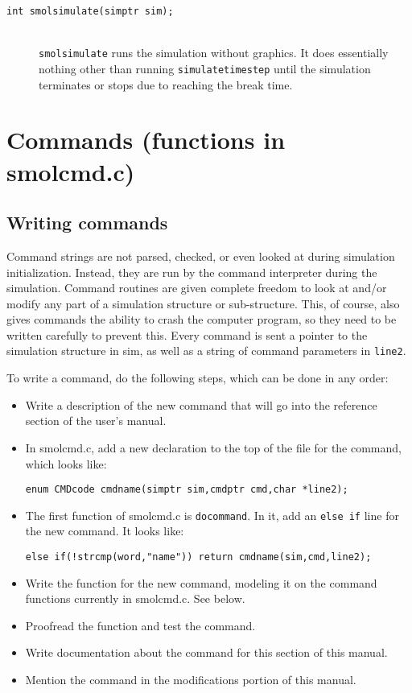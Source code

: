\documentclass {book}
\newcommand {\ttt} {\texttt}
\begin{document}
\begin{description}
\item[\ttt{int smolsimulate(simptr sim);}]
\hfill \\
\ttt{smolsimulate} runs the simulation without graphics. It does essentially nothing other than running \ttt{simulatetimestep} until the simulation terminates or stops due to reaching the break time.

\end{description}

\section{Commands (functions in smolcmd.c)}

\subsection*{Writing commands}

Command strings are not parsed, checked, or even looked at during simulation initialization. Instead, they are run by the command interpreter during the simulation. Command routines are given complete freedom to look at and/or modify any part of a simulation structure or sub-structure. This, of course, also gives commands the ability to crash the computer program, so they need to be written carefully to prevent this. Every command is sent a pointer to the simulation structure in sim, as well as a string of command parameters in \ttt{line2}.

To write a command, do the following steps, which can be done in any order:

\begin{itemize}
\item Write a description of the new command that will go into the reference section of the user's manual.
\item In smolcmd.c, add a new declaration to the top of the file for the command, which looks like:
\begin{lstlisting}
enum CMDcode cmdname(simptr sim,cmdptr cmd,char *line2);
\end{lstlisting}
\item The first function of smolcmd.c is \ttt{docommand}. In it, add an \ttt{else if} line for the new command. It looks like:
\begin{lstlisting}
else if(!strcmp(word,"name")) return cmdname(sim,cmd,line2);
\end{lstlisting}
\item Write the function for the new command, modeling it on the command functions currently in smolcmd.c. See below.
\item Proofread the function and test the command.
\item Write documentation about the command for this section of this manual.
\item Mention the command in the modifications portion of this manual.
\end{itemize}
\end{document}

